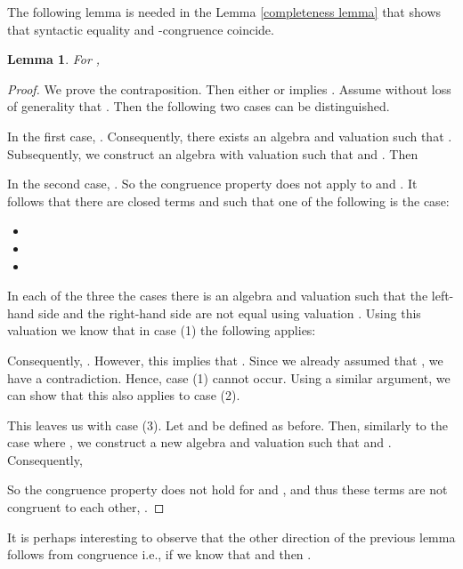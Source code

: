 \documentclass[a4paper,twoside,openright]{report}
\newtheorem{lem}[theorem]{Lemma}
\begin{document}
The following lemma is needed in the Lemma \ref{completeness lemma} that shows that syntactic equality and -congruence coincide.
\begin{lem}\label{inv congr lemma}
For ,

\end{lem}
\begin{proof}
We prove the contraposition. Then either  or  implies . Assume without loss of generality that . Then the following two cases can be distinguished.

In the first case, . Consequently, there exists an algebra  and valuation  such that . Subsequently, we construct an algebra  with valuation  such that  and . Then


In the second case, . So the congruence property does not apply to  and . It follows that there are closed terms  and  such that one of the following is the case:
\begin{itemize}
\item[(1)] 
\item[(2)] 
\item[(3)] 
\end{itemize}
In each of the three the cases there is an algebra  and valuation  such that the left-hand side and the right-hand side are not equal using  valuation . Using this valuation  we know that in case (1) the following applies:

Consequently, . However, this implies that . Since we already assumed that , we have a contradiction. Hence, case (1) cannot occur. Using a similar argument, we can show that this also applies to case (2).

This leaves us with case (3). Let  and  be defined as before. Then, similarly to the case where , we construct a new algebra  and valuation  such that  and . Consequently,

So the congruence property does not hold for  and , and thus these terms are not congruent to each other, .
\end{proof}
It is perhaps interesting to observe that the other direction of the previous lemma follows from congruence i.e., if we know that  and  then .
\end{document}
